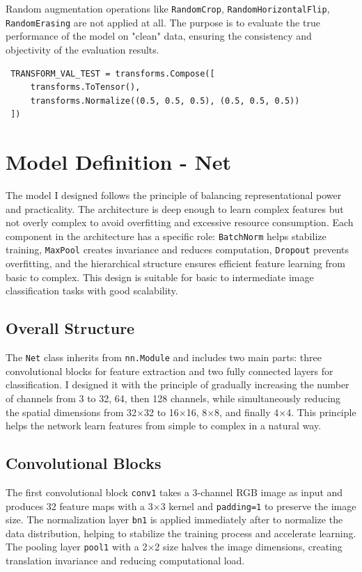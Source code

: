 \documentclass[12pt, a4paper, openany]{report}
\begin{document}
 Random augmentation operations like \texttt{RandomCrop}, \texttt{RandomHorizontalFlip}, \texttt{RandomErasing} are not applied at all. The purpose is to evaluate the true performance of the model on "clean" data, ensuring the consistency and objectivity of the evaluation results.

 \begin{verbatim}
 TRANSFORM_VAL_TEST = transforms.Compose([
     transforms.ToTensor(),
     transforms.Normalize((0.5, 0.5, 0.5), (0.5, 0.5, 0.5))
 ])
 \end{verbatim}

 \section{Model Definition - Net} %
 The model I designed follows the principle of balancing representational power and practicality. The architecture is deep enough to learn complex features but not overly complex to avoid overfitting and excessive resource consumption. Each component in the architecture has a specific role: \texttt{BatchNorm} helps stabilize training, \texttt{MaxPool} creates invariance and reduces computation, \texttt{Dropout} prevents overfitting, and the hierarchical structure ensures efficient feature learning from basic to complex. This design is suitable for basic to intermediate image classification tasks with good scalability.

 \subsection{Overall Structure} %
 The \texttt{Net} class inherits from \texttt{nn.Module} and includes two main parts: three convolutional blocks for feature extraction and two fully connected layers for classification. I designed it with the principle of gradually increasing the number of channels from 3 to 32, 64, then 128 channels, while simultaneously reducing the spatial dimensions from 32×32 to 16×16, 8×8, and finally 4×4. This principle helps the network learn features from simple to complex in a natural way.

 \subsection{Convolutional Blocks} %
 The first convolutional block \texttt{conv1} takes a 3-channel RGB image as input and produces 32 feature maps with a 3×3 kernel and \texttt{padding=1} to preserve the image size. The normalization layer \texttt{bn1} is applied immediately after to normalize the data distribution, helping to stabilize the training process and accelerate learning. The pooling layer \texttt{pool1} with a 2×2 size halves the image dimensions, creating translation invariance and reducing computational load.
\end{document}
